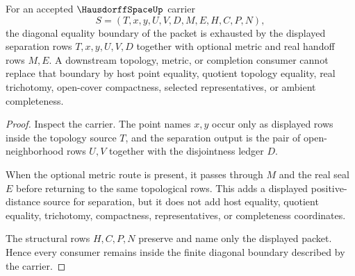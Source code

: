 \begin{theorem}
\label{thm:hausdorff-space-diagonal-nonescape}
For an accepted $\HausdorffSpaceUp$ carrier
$$
S=(T,x,y,U,V,D,M,E,H,C,P,N),
$$
the diagonal equality boundary of the packet is exhausted by the displayed separation rows $T,x,y,U,V,D$ together with optional metric and real handoff rows $M,E$. A downstream topology, metric, or completion consumer cannot replace that boundary by host point equality, quotient topology equality, real trichotomy, open-cover compactness, selected representatives, or ambient completeness.
\end{theorem}
\begin{proof}
Inspect the carrier. The point names $x,y$ occur only as displayed rows inside the topology source $T$, and the separation output is the pair of open-neighborhood rows $U,V$ together with the disjointness ledger $D$.

When the optional metric route is present, it passes through $M$ and the real seal $E$ before returning to the same topological rows. This adds a displayed positive-distance source for separation, but it does not add host equality, quotient equality, trichotomy, compactness, representatives, or completeness coordinates.

The structural rows $H,C,P,N$ preserve and name only the displayed packet. Hence every consumer remains inside the finite diagonal boundary described by the carrier.
\end{proof}

